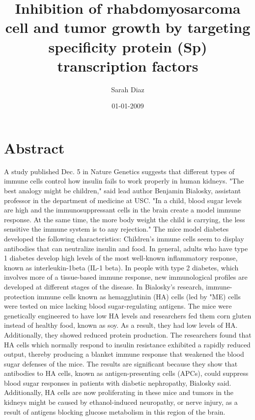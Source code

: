 \documentclass{article}%
\title{Inhibition of rhabdomyosarcoma cell and tumor growth by targeting specificity protein (Sp) transcription factors}%
\author{Sarah Diaz}%
\affil{CAS Key Laboratory of Pathogenic Microbiology and Immunology, Institute of Microbiology, Chinese Academy of Sciences, Beijing, China}%
\date{01{-}01{-}2009}%
\begin{document}
%
\normalsize%
\maketitle%
\section{Abstract}%
\label{sec:Abstract}%
A study published Dec. 5 in Nature Genetics suggests that different types of immune cells control how insulin fails to work properly in human kidneys.\newline%
"The best analogy might be children," said lead author Benjamin Bialosky, assistant professor in the department of medicine at USC. "In a child, blood sugar levels are high and the immunosuppressant cells in the brain create a model immune response. At the same time, the more body weight the child is carrying, the less sensitive the immune system is to any rejection."\newline%
The mice model diabetes developed the following characteristics: Children's immune cells seem to display antibodies that can neutralize insulin and food.\newline%
In general, adults who have type 1 diabetes develop high levels of the most well{-}known inflammatory response, known as interleukin{-}1beta (IL{-}1 beta). In people with type 2 diabetes, which involves more of a tissue{-}based immune response, new immunological profiles are developed at different stages of the disease.\newline%
In Bialosky's research, immune{-}protection immune cells known as hemagglutinin (HA) cells (led by "ME) cells were tested on mice lacking blood sugar{-}regulating antigens. The mice were genetically engineered to have low HA levels and researchers fed them corn gluten instead of healthy food, known as soy.\newline%
As a result, they had low levels of HA. Additionally, they showed reduced protein production.\newline%
The researchers found that HA cells which normally respond to insulin resistance exhibited a rapidly reduced output, thereby producing a blanket immune response that weakened the blood sugar defenses of the mice.\newline%
The results are significant because they show that antibodies to HA cells, known as antigen{-}presenting cells (APCs), could suppress blood sugar responses in patients with diabetic nephropathy, Bialosky said.\newline%
Additionally, HA cells are now proliferating in these mice and tumors in the kidneys might be caused by ethanol{-}induced neuropathy, or nerve injury, as a result of antigens blocking glucose metabolism in this region of the brain.
\end{document}
